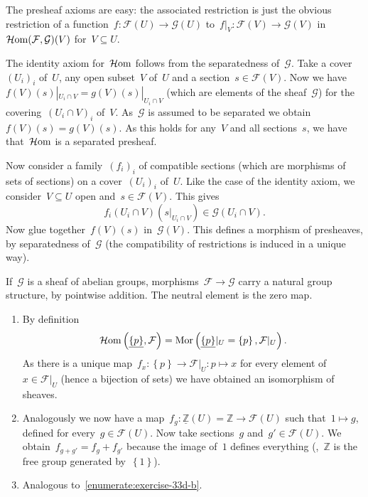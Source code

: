 \begin{exercise}
  The presheaf axioms are easy: the associated restriction is just the obvious restriction of a function~$f\colon\mathcal{F}(U)\to\mathcal{G}(U)$ to~$f|_V\colon\mathcal{F}(V)\to\mathcal{G}(V)$ in~$\operatorname{\mathcal{H}om}(\mathcal{F},\mathcal{G})(V)$ for~$V\subseteq U$.

  The identity axiom for~$\operatorname{\mathcal{H}om}$ follows from the separatedness of~$\mathcal{G}$. Take a cover~$(U_i)_i$ of~$U$, any open subset~$V$ of~$U$ and a section~$s\in\mathcal{F}(V)$. Now we have~$f(V)(s)|_{U_i\cap V}=g(V)(s)|_{U_i\cap V}$ (which are elements of the sheaf~$\mathcal{G}$) for the covering~$(U_i\cap V)_i$ of~$V$. As~$\mathcal{G}$ is assumed to be separated we obtain~$f(V)(s)=g(V)(s)$. As this holds for any~$V$ and all sections~$s$, we have that~$\operatorname{\mathcal{H}om}$ is a separated presheaf.

  Now consider a family~$(f_i)_i$ of compatible sections (which are morphisms of sets of sections) on a cover~$(U_i)_i$ of~$U$. Like the case of the identity axiom, we consider~$V\subseteq U$ open and~$s\in\mathcal{F}(V)$. This gives
  \begin{equation}
    f_i(U_i\cap V)(s|_{U_i\cap V})\in\mathcal{G}(U_i\cap V).
  \end{equation}
  Now glue together~$f(V)(s)$ in~$\mathcal{G}(V)$. This defines a morphism of presheaves, by separatedness of~$\mathcal{G}$ (the compatibility of restrictions is induced in a unique way).

  If~$\mathcal{G}$ is a sheaf of abelian groups, morphisms~$\mathcal{F}\to\mathcal{G}$ carry a natural group structure, by pointwise addition. The neutral element is the zero map.
\end{exercise}

\begin{exercise}
  \begin{enumerate}
    \item By definition
      \begin{equation}
        \operatorname{\mathcal{H}om}\left( \underline{\left\{ p \right\}},\mathcal{F} \right)=\operatorname{Mor}\left( \underline{\left\{ p \right\}}|_U=\left\{ p \right\},\mathcal{F}|_U \right).
      \end{equation}
      As there is a unique map~$f_x\colon\left\{ p \right\}\to\mathcal{F}|_U:p\mapsto x$ for every element of~$x\in\mathcal{F}|_U$ (hence a bijection of sets) we have obtained an isomorphism of sheaves.

    \item\label{enumerate:exercise-33d-b} Analogously we now have a map~$f_g\colon\underline{\mathbb{Z}}(U)=\mathbb{Z}\to\mathcal{F}(U)$ such that~$1\mapsto g$, defined for every~$g\in\mathcal{F}(U)$. Now take sections~$g$ and~$g'\in\mathcal{F}(U)$. We obtain~$f_{g+g'}=f_g+f_{g'}$ because the image of~$1$ defines everything (\ie,~$\mathbb{Z}$ is the free group generated by~$\left\{ 1 \right\}$).

    \item Analogous to~\ref{enumerate:exercise-33d-b}.
  \end{enumerate}
\end{exercise}

